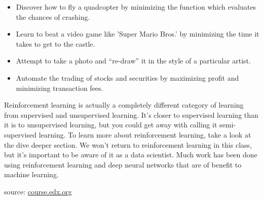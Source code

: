 \documentclass{article}
\begin{document}
\begin{itemize}
    \item Discover how to fly a quadcopter by minimizing the function which evaluates the chances of crashing.
    \item Learn to beat a video game like 'Super Mario Bros.' by minimizing the time it takes to get to the castle.
    \item Attempt to take a photo and ``re-draw'' it in the style of a particular artist.
    \item Automate the trading of stocks and securities by maximizing profit and minimizing transaction fees.
\end{itemize}

\par Reinforcement learning is actually a completely different category of learning from supervised and unsupervised learning. It's closer to supervised learning than it is to unsupervised learning, but you could get away with calling it semi-supervised learning. To learn more about reinforcement learning, take a look at the dive deeper section. We won't return to reinforcement learning in this class, but it's important to be aware of it as a data scientist. Much work has been done using reinforcement learning and deep neural networks that are of benefit to machine learning.
\begin{flushright}
    source: \href{https://courses.edx.org/courses/course-v1:Microsoft+DAT210x+6T2016/courseware/e36e6b45ae5d4032bef2ec557c1ff48f/a8cf8333f6044e9b9a357b7797f282e3/?child=first}{course.edx.org}  
\end{flushright}
\end{document}
